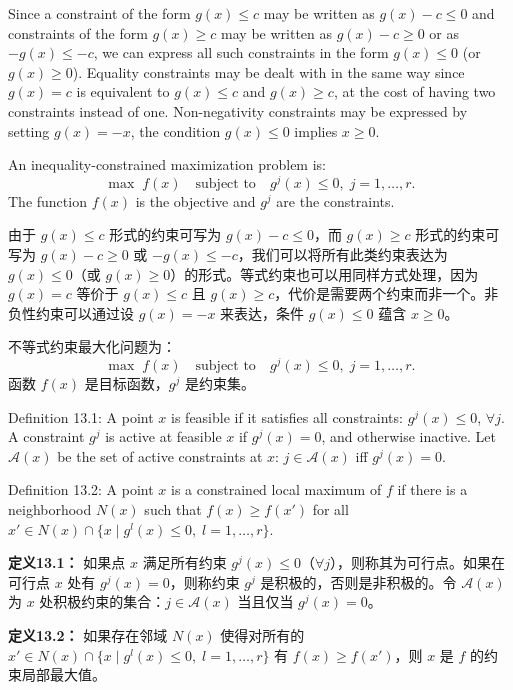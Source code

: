 \begin{original}
Since a constraint of the form $g(x) \le c$ may be written as $g(x) - c \le 0$ and constraints of the form $g(x) \ge c$ may be written as $g(x) - c \ge 0$ or as $-g(x) \le -c$, we can express all such constraints in the form $g(x) \le 0$ (or $g(x) \ge 0$). Equality constraints may be dealt with in the same way since $g(x) = c$ is equivalent to $g(x) \le c$ and $g(x) \ge c$, at the cost of having two constraints instead of one. Non-negativity constraints may be expressed by setting $g(x) = -x$, the condition $g(x) \le 0$ implies $x \ge 0$.

An inequality-constrained maximization problem is:
\[
\max \; f(x) \quad \text{subject to} \quad g^j(x) \le 0,\; j = 1, \dots, r. \tag{13.2}
\]
The function $f(x)$ is the objective and $g^j$ are the constraints.
\end{original}
\begin{translation}
由于 $g(x) \le c$ 形式的约束可写为 $g(x) - c \le 0$，而 $g(x) \ge c$ 形式的约束可写为 $g(x) - c \ge 0$ 或 $-g(x) \le -c$，我们可以将所有此类约束表达为 $g(x) \le 0$（或 $g(x) \ge 0$）的形式。等式约束也可以用同样方式处理，因为 $g(x) = c$ 等价于 $g(x) \le c$ 且 $g(x) \ge c$，代价是需要两个约束而非一个。非负性约束可以通过设 $g(x) = -x$ 来表达，条件 $g(x) \le 0$ 蕴含 $x \ge 0$。

不等式约束最大化问题为：
\[
\max \; f(x) \quad \text{subject to} \quad g^j(x) \le 0,\; j = 1, \dots, r. \tag{13.2}
\]
函数 $f(x)$ 是目标函数，$g^j$ 是约束集。
\end{translation}

\begin{original}
Definition 13.1: A point $x$ is feasible if it satisfies all constraints: $g^j(x) \le 0$, $\forall j$. A constraint $g^j$ is active at feasible $x$ if $g^j(x) = 0$, and otherwise inactive. Let $\mathcal{A}(x)$ be the set of active constraints at $x$: $j \in \mathcal{A}(x)$ iff $g^j(x) = 0$.

Definition 13.2: A point $x$ is a constrained local maximum of $f$ if there is a neighborhood $N(x)$ such that $f(x) \ge f(x')$ for all $x' \in N(x) \cap \{x \mid g^l(x) \le 0,\; l = 1,\dots, r\}$.
\end{original}
\begin{translation}
\textbf{定义13.1：} 如果点 $x$ 满足所有约束 $g^j(x) \le 0$（$\forall j$），则称其为可行点。如果在可行点 $x$ 处有 $g^j(x) = 0$，则称约束 $g^j$ 是积极的，否则是非积极的。令 $\mathcal{A}(x)$ 为 $x$ 处积极约束的集合：$j \in \mathcal{A}(x)$ 当且仅当 $g^j(x) = 0$。

\textbf{定义13.2：} 如果存在邻域 $N(x)$ 使得对所有的 $x' \in N(x) \cap \{x \mid g^l(x) \le 0,\; l = 1,\dots, r\}$ 有 $f(x) \ge f(x')$，则 $x$ 是 $f$ 的约束局部最大值。
\end{translation}

